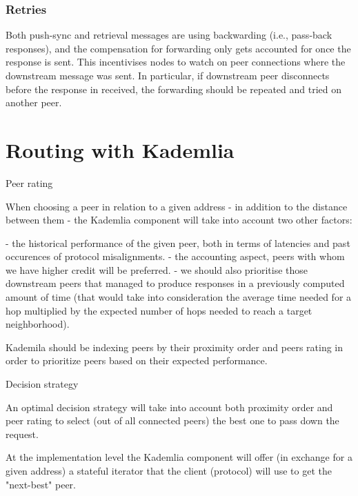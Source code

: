 \subsubsection{Retries}

Both push-sync and retrieval messages are using backwarding (i.e., pass-back responses), and the compensation for forwarding only gets accounted for once the response is sent. This incentivises nodes to watch on peer connections where the downstream message was sent. In particular, if downstream peer disconnects  before the response in received, the forwarding should be repeated and tried on another peer.







\section{Routing with Kademlia}


Peer rating

When choosing a peer in relation to a given address - in addition to the distance between them - the Kademlia component will take into account two other factors:

- the historical performance of the given peer, both in terms of latencies and past occurences of protocol misalignments.
- the accounting aspect, peers with whom we have higher credit will be preferred.
- we should also prioritise those downstream peers that managed to produce responses in a previously computed amount of time (that would take into consideration the average time needed for a hop multiplied by the expected number of hops needed to reach a target neighborhood).

Kademila should be indexing peers by their proximity order and peers rating in order to prioritize peers based on their expected performance.

Decision strategy

An optimal decision strategy will take into account both proximity order and peer rating to select (out of all connected peers) the best one to pass down the request.

At the implementation level the Kademlia component will offer (in exchange for a given address) a stateful iterator that the client (protocol) will use to get the "next-best" peer.



